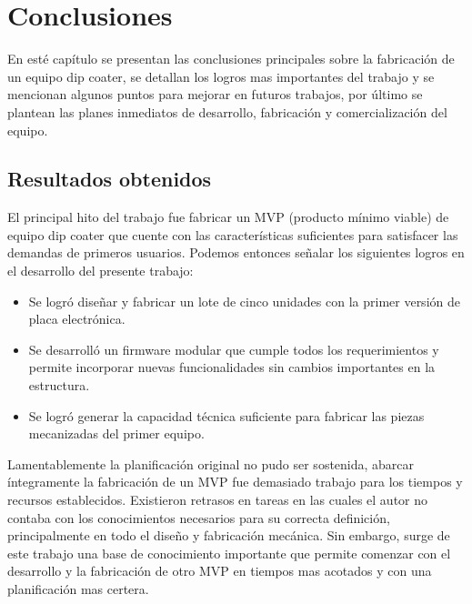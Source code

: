 
\chapter{Conclusiones} %

\label{Chapter5} %



En esté capítulo se presentan las conclusiones principales sobre la fabricación de un equipo dip coater, se detallan los logros mas importantes del trabajo y se mencionan algunos puntos para mejorar en futuros trabajos, por último se plantean las planes inmediatos de desarrollo, fabricación y comercialización del equipo.

\section{Resultados obtenidos }


El principal hito del trabajo fue fabricar un MVP (producto mínimo viable) de equipo dip coater que cuente con las características suficientes para satisfacer las demandas de primeros usuarios. Podemos entonces señalar los siguientes logros en el desarrollo del presente trabajo: 
\begin{itemize}
\item Se logró diseñar y fabricar un lote de cinco unidades con la primer versión de placa electrónica.
\item Se desarrolló un firmware modular que cumple todos los requerimientos y permite incorporar nuevas funcionalidades sin cambios importantes en la estructura.
\item Se logró generar la capacidad técnica suficiente para fabricar las piezas mecanizadas del primer equipo.  
\end{itemize} 
 


Lamentablemente la planificación original no pudo ser sostenida, abarcar íntegramente la fabricación de un MVP fue demasiado trabajo para los tiempos y recursos establecidos. Existieron retrasos en tareas en las cuales el autor no contaba con los conocimientos necesarios para su correcta definición, principalmente en todo el diseño y fabricación mecánica. Sin embargo, surge de este trabajo una base de conocimiento importante que permite comenzar con el desarrollo y la fabricación de otro MVP en tiempos mas acotados y con una planificación mas certera. 


